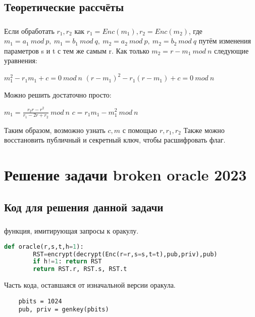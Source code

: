 \documentclass[t]{beamer}
\begin{document}
\subsection{Теоретические рассчёты}
\begin{frame}
	\frametitle{\insertsection}
	\framesubtitle{\insertsubsection}
    Если обработать $r_1,r_2$ как $r_1=Enc(m_1),r_2=Enc(m_2)$, где $m_1=a_1\ mod\ p,\ m_1=b_1\ mod\ q,\ m_2=a_2\ mod\ p,\ m_2=b_2\ mod\ q$ путём изменения параметров s и t с тем же самым r. Как только $m_2=r-m_1\ mod\ n$ следующие уравнения:
    \begin{center}
        $m^2_1-r_1m_1+c=0\ mod\ n$ \newline
        $(r-m_1)^2-r_1(r-m_1)+c=0\ mod\ n$
    \end{center}
     Можно решить достаточно просто:
     \begin{center}
        $m_1=\frac{r_2r-r^2}{r_1-2r+r_2}\ mod\ n$ \newline
        $c=r_1m_1-m^2_1\ mod\ n$ \newline
    \end{center}
    Таким образом, возможно узнать $c,m$ с помощью $r,r_1,r_2$\newline
    Также можно восстановить публичный и секретный ключ, чтобы расшифровать флаг.
\end{frame}
\section{Решение задачи broken oracle 2023}
\subsection{Код для решения данной задачи}
\begin{frame}[fragile]
\frametitle{\insertsection} 
\framesubtitle{\insertsubsection}
\footnotesize
\smaller
функция, имитирующая запросы к оракулу.
\begin{lstlisting}[language=Python]
    def oracle(r,s,t,h=1):
        RST=encrypt(decrypt(Enc(r=r,s=s,t=t),pub,priv),pub)
        if h!=1: return RST
        return RST.r, RST.s, RST.t
\end{lstlisting}
\newline
Часть кода, оставшаяся от изначальной версии оракула.
\begin{lstlisting}
    pbits = 1024
    pub, priv = genkey(pbits)
\end{lstlisting}
\end{frame}
\end{document}

